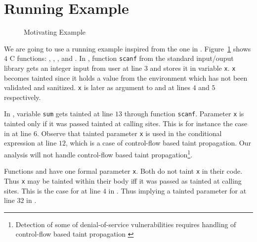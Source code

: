 \section{Running Example}\label{sec:example} 

\begin{figure}[!ht]
\centering
{}
\caption{Motivating Example}
\label{fig:sample}
\end{figure}

We are going to use a running example inspired from
the one in \cite{Dimitru:2009:STAC}.
Figure~\ref{fig:sample} shows $4$ C functions:
\main{}, \even{}, \odd{}, and \compute{}.
In \main{}, function \texttt{scanf} from the standard input/ouput
library gets an integer input from user at line $3$
and stores it in variable \texttt{x}. \texttt{x} 
becomes tainted since it holds a value from
the environment which has not been validated and
sanitized.
\texttt{x} is later as argument to \even{} and \odd{} at
lines $4$ and $5$ respectively.

In \compute{}, variable \texttt{sum} gets tainted at
line $13$ through function \texttt{scanf}. Parameter
\texttt{x} is tainted only if it was passed tainted
at calling sites.
This is for instance the case in \main{} at line $6$.
Observe that tainted parameter \texttt{x} is used in
the conditional expression at line $12$, which is
a case of control-flow based taint propagation.
Our analysis will not handle control-flow based taint
propagation\footnote{Detection of some of denial-of-service
vulnerabilities requires handling of control-flow based
taint propagation \cite{Chang:2009:ICS}}. 

Functions \even{} and \odd{} have one formal parameter
\texttt{x}. Both do not taint \texttt{x} in their code.
Thus \texttt{x} may be tainted within their body iff it was
passed as tainted at calling sites. This is the case
for \even{} at line $4$ in \main{}. Thus implying a tainted
parameter for \odd{} at line $32$ in \even{}.